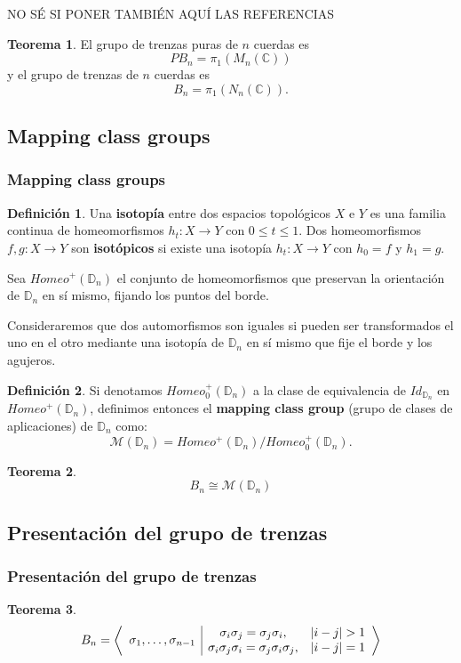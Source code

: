 \documentclass{beamer}
\theoremstyle{definition}
\newtheorem{teorema}{Teorema}
\newtheorem{defi}{Definición}
\newcommand{\C}{\mathbb{C}}
\newcommand{\D}{\mathbb{D}}
\begin{document}
\begin{frame}
NO SÉ SI PONER TAMBIÉN AQUÍ LAS REFERENCIAS 
\begin{teorema}
El grupo de trenzas puras de $n$ cuerdas es
$$PB_n=\pi_1(M_n(\C))$$
y el grupo de trenzas de $n$ cuerdas es
$$B_n=\pi_1(N_n(\C)).$$
\end{teorema}
\end{frame}

\subsection{Mapping class groups}

\begin{frame}
\frametitle{Mapping class groups}
\begin{defi}
Una \textbf{isotopía} entre dos espacios topológicos $X$ e $Y$ es una familia continua de homeomorfismos $h_t:X\to Y$ con $0\leq t\leq 1$. Dos homeomorfismos $f,g:X\to Y$ son \textbf{isotópicos} si existe una isotopía $h_t:X\to Y$ con $h_0=f$ y $h_1=g$. 
\end{defi}
Sea $Homeo^+(\D_n)$ el conjunto de homeomorfismos que preservan la orientación de $\D_n$ en sí mismo, fijando los puntos del borde. 
\end{frame}


\begin{frame}
Consideraremos que dos automorfismos son iguales si pueden ser transformados el uno en el otro mediante una isotopía de $\D_n$ en sí mismo que fije el borde y los agujeros.
\begin{defi} Si denotamos $Homeo^+_0(\D_n)$ a la clase de equivalencia de $Id_{\D_n}$ en $Homeo^+(\D_n)$, definimos entonces el \textbf{mapping class group} (grupo de clases de aplicaciones) de $\D_n$ como:
$$\mathcal{M}(\D_n)=Homeo^+(\D_n)/Homeo^+_0(\D_n).$$
\end{defi}
\begin{teorema}
$$B_n\cong \mathcal{M}(\D_n)$$
\end{teorema}
\end{frame}

\subsection{Presentación del grupo de trenzas}



\begin{frame}
\frametitle{Presentación del grupo de trenzas}
\begin{teorema}
\[
B_n=\left\langle\begin{array}{c| c c}
\multirow{2}{*}{$\sigma_1,\dots,\sigma_{n-1}$} & \sigma_i\sigma_j=\sigma_j\sigma_i, & |i-j|>1\\
& \sigma_i\sigma_j\sigma_i=\sigma_j\sigma_i\sigma_j, & |i-j|=1
\end{array}\right\rangle
\]
\end{teorema}
\end{frame}
\end{document}
